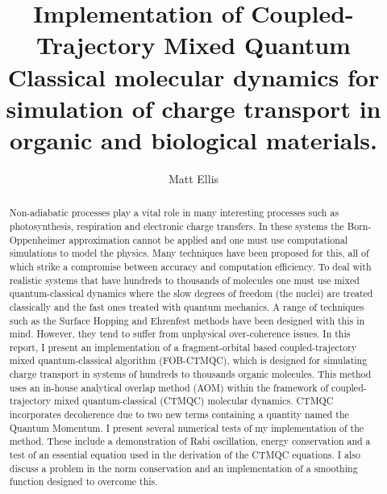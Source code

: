  \makeatletter
\renewcommand {\@degree@string} {Master of Philosophy to Doctor of Philosophy}
 \makeatother

\title{Implementation of Coupled-Trajectory Mixed Quantum Classical molecular dynamics for simulation of charge transport in organic and biological materials.    }
\author{Matt Ellis}

\maketitle
\begin{abstract} %
Non-adiabatic processes play a vital role in many interesting processes such as photosynthesis, respiration and electronic charge transfers. In these systems the Born-Oppenheimer approximation cannot be applied and one must use computational simulations to model the physics. Many techniques have been proposed for this, all of which strike a compromise between accuracy and computation efficiency. To deal with realistic systems that have hundreds to thousands of molecules one must use mixed quantum-classical dynamics where the slow degrees of freedom (the nuclei) are treated classically and the fast ones treated with quantum mechanics. A range of techniques such as the Surface Hopping and Ehrenfest methods have been designed with this in mind. However, they tend to suffer from unphysical over-coherence issues. In this report, I present an implementation of a fragment-orbital based coupled-trajectory mixed quantum-classical algorithm (FOB-CTMQC), which is designed for simulating charge transport in systems of hundreds to thousands organic molecules. This method uses an in-house analytical overlap method (AOM) within the framework of coupled-trajectory mixed quantum-classical (CTMQC) molecular dynamics. CTMQC incorporates decoherence due to two new terms containing a quantity named the Quantum Momentum. I present several numerical tests of my implementation of the method. These include a demonstration of Rabi oscillation, energy conservation and a test of an essential equation used in the derivation of the CTMQC equations. I also discuss a problem in the norm conservation and an implementation of a smoothing function designed to overcome this.
\end{abstract}

\setcounter{tocdepth}{2}

\tableofcontents
